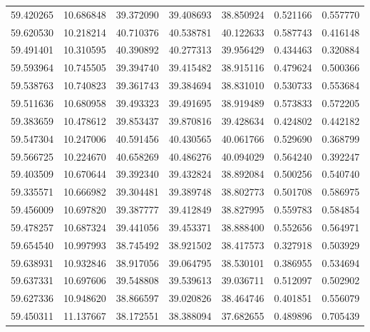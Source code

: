 \begin{tabular}{rrrrrrr}
 59.420265 &  10.686848 &         39.372090 &         39.408693 &         38.850924 &  0.521166 &  0.557770 \\
 59.620530 &  10.218214 &         40.710376 &         40.538781 &         40.122633 &  0.587743 &  0.416148 \\
 59.491401 &  10.310595 &         40.390892 &         40.277313 &         39.956429 &  0.434463 &  0.320884 \\
 59.593964 &  10.745505 &         39.394740 &         39.415482 &         38.915116 &  0.479624 &  0.500366 \\
 59.538763 &  10.740823 &         39.361743 &         39.384694 &         38.831010 &  0.530733 &  0.553684 \\
 59.511636 &  10.680958 &         39.493323 &         39.491695 &         38.919489 &  0.573833 &  0.572205 \\
 59.383659 &  10.478612 &         39.853437 &         39.870816 &         39.428634 &  0.424802 &  0.442182 \\
 59.547304 &  10.247006 &         40.591456 &         40.430565 &         40.061766 &  0.529690 &  0.368799 \\
 59.566725 &  10.224670 &         40.658269 &         40.486276 &         40.094029 &  0.564240 &  0.392247 \\
 59.403509 &  10.670644 &         39.392340 &         39.432824 &         38.892084 &  0.500256 &  0.540740 \\
 59.335571 &  10.666982 &         39.304481 &         39.389748 &         38.802773 &  0.501708 &  0.586975 \\
 59.456009 &  10.697820 &         39.387777 &         39.412849 &         38.827995 &  0.559783 &  0.584854 \\
 59.478257 &  10.687324 &         39.441056 &         39.453371 &         38.888400 &  0.552656 &  0.564971 \\
 59.654540 &  10.997993 &         38.745492 &         38.921502 &         38.417573 &  0.327918 &  0.503929 \\
 59.638931 &  10.932846 &         38.917056 &         39.064795 &         38.530101 &  0.386955 &  0.534694 \\
 59.637331 &  10.697606 &         39.548808 &         39.539613 &         39.036711 &  0.512097 &  0.502902 \\
 59.627336 &  10.948620 &         38.866597 &         39.020826 &         38.464746 &  0.401851 &  0.556079 \\
 59.450311 &  11.137667 &         38.172551 &         38.388094 &         37.682655 &  0.489896 &  0.705439 \\

\end{tabular}
